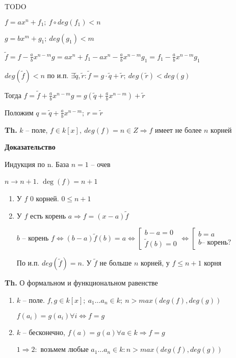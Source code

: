 \documentclass[14pt, letter paper]{article}
\begin{document}
TODO

$f = ax^n + f_1;\ f \circ deg(f_1) < n$

$g = bx^m + g_1;\ deg(g_1) < m$

$\tilde{f} = f - \frac{a}{b}x^{n - m}g = ax^n + f_1 - ax^n - \frac{a}{b}x^{n-m}g_1 = f_1 - \frac{a}{b}x^{n-m}g_1$

$deg(\tilde{f}) < n$ по и.п. $\exists \tilde{q}, \tilde{r} : \tilde{f} = g \cdot \tilde{q} + \tilde{r};\ deg(\tilde{r}) < deg(g)$

Тогда $f = \tilde{f} + \frac{a}{b}x^{n-m}g = g(\tilde{q} + \frac{a}{b}x^{n-m}) + \tilde{r}$

Положим $q = \tilde{q} + \frac{a}{b}x^{n-m};\ r = \tilde{r}$

\vspace{5mm}

\textbf{Th.} $k$ -- поле, $f \in k[x],\ deg(f) = n \in Z \Rightarrow f$ имеет не более $n$ корней

\begin{center}
    \textbf{Доказательство}
\end{center}

Индукция по n. База $n = 1$ -- очев

$n \rightarrow n + 1$. $\deg(f) = n + 1$

\begin{enumerate}
    \item У $f$ 0 корней. $0 \leq n + 1$
    \item У $f$ есть корень $a \Rightarrow f = (x-a)\tilde{f}$

    $b$ -- корень $f \Leftrightarrow (b-a)\tilde{f}(b) = a \Leftrightarrow \left[ \begin{gathered}
        b - a = 0 \\
        \tilde{f}(b) = 0
    \end{gathered} \right. \Leftrightarrow \left[ \begin{gathered}
        b = a \\
        b \text{-- корень?}
    \end{gathered} \right.$

    По и.п. $deg(\tilde{f}) = n$. У $\tilde{f}$ не больше $n$ корней, у $f \leq n + 1$ корня
\end{enumerate}

\vspace{5mm}

\textbf{Th.} О формальном и функциональном равенстве

\begin{enumerate}
    \item $k$ -- поле. $f, g \in k[x];\ a_1 \ldots a_n \in k;\ n > max(deg(f), deg(g))$

    $f(a_i) = g(a_i) \forall i \Leftrightarrow f = g$

    \item $k$ -- бесконечно, $f(a) = g(a) \forall a \in k \Rightarrow f = g$

    $1 \Rightarrow 2:$ возьмем любые $a_1 \ldots a_n \in k : n > max(deg(f), deg(g))$
\end{enumerate}
\end{document}
